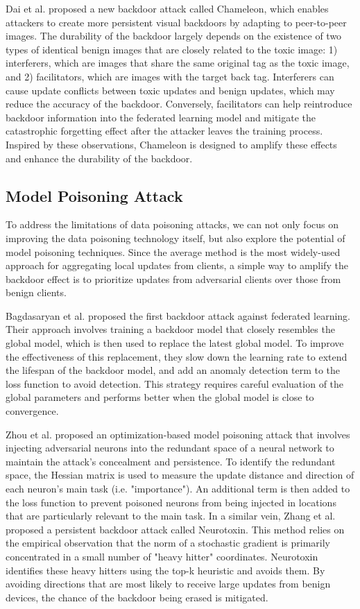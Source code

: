 \documentclass[conference]{IEEEtran}
\begin{document}
Dai et al.\cite{b64} proposed a new backdoor attack called Chameleon,
which enables attackers to create more persistent visual backdoors by adapting
to peer-to-peer images. The durability of the backdoor largely depends
on the existence of two types of identical benign images that are closely
related to the toxic image: 1) interferers, which are images that share
the same original tag as the toxic image, and 2) facilitators, which are
images with the target back tag. Interferers can cause update conflicts
between toxic updates and benign updates, which may reduce the accuracy of
the backdoor. Conversely, facilitators can help reintroduce backdoor
information into the federated learning model and mitigate the catastrophic
forgetting effect after the attacker leaves the training process. Inspired by
these observations, Chameleon is designed to amplify these effects and enhance
the durability of the backdoor.

\subsection{Model Poisoning Attack}
To address the limitations of data poisoning attacks, we can not only focus on
improving the data poisoning technology itself, but also explore the potential
of model poisoning techniques. Since the average method is the most widely-used
approach for aggregating local updates from clients, a simple way to amplify
the backdoor effect is to prioritize updates from adversarial clients over
those from benign clients.

Bagdasaryan et al.\cite{b24} proposed the first backdoor attack against federated learning.
Their approach involves training a backdoor model that closely resembles the global
model, which is then used to replace the latest global model.
To improve the effectiveness of this replacement, they slow down
the learning rate to extend the lifespan of the backdoor model, and add an
anomaly detection term to the loss function to avoid detection. This
strategy requires careful evaluation of the global parameters and performs
better when the global model is close to convergence.

Zhou et al.\cite{b63} proposed an optimization-based model poisoning attack that
involves injecting adversarial neurons into the redundant space of a neural network
to maintain the attack's concealment and persistence. To identify the redundant
space, the Hessian matrix is used to measure the update distance and direction of each neuron's main task (i.e. "importance").
An additional term is then added to the loss function to prevent poisoned neurons from being injected
in locations that are particularly relevant to the main task.
In a similar vein, Zhang et al.\cite{b62}
proposed a persistent backdoor attack called Neurotoxin. This method
relies on the empirical observation that the norm of a stochastic gradient
is primarily concentrated in a small number of "heavy hitter" coordinates.
Neurotoxin identifies these heavy hitters using the top-k heuristic and
avoids them. By avoiding directions that are most likely to receive large
updates from benign devices, the chance of the backdoor being erased is mitigated.
\end{document}
